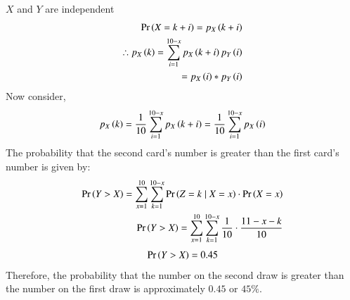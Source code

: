 \documentclass[journal,12pt,onecolumn]{IEEEtran}
\theoremstyle{remark}
\begin{document}
$X$ and $Y$ are independent
\begin{align}
\Pr\left(X = k + i\right) = p_X\left(k + i\right)\\
\therefore p_X\left(k\right) = \sum_{i=1}^{10-x} p_X\left(k + i\right) p_Y\left(i\right)\\
                       = p_X\left(i\right) * p_Y\left(i\right)
\end{align}
Now consider, 
\begin{align}
      p_X\left(k\right) = \frac{1}{10} \sum_{i=1}^{10-x} p_X\left(k + i\right) = \frac{1}{10} \sum_{i=1}^{10-x} p_X\left(i\right)
\end{align}      
The probability that the second card's number is greater than the first card's number is given by:
\begin{align}
\Pr\left(Y>X\right) = \sum_{x=1}^{10}\sum_{k=1}^{10-x} \Pr\left(Z = k \mid X = x\right) \cdot \Pr\left(X = x\right)\\
\Pr\left(Y>X\right) = \sum_{x=1}^{10}\sum_{k=1}^{10-x} \frac{1}{10} \cdot \frac{11-x-k}{10}
\end{align}
\begin{align}
\Pr\left(Y > X\right) = 0.45
\end{align}
Therefore, the probability that the number on the second draw is greater than the number on the first draw is approximately $0.45$ or $45\%$.
\end{document}
